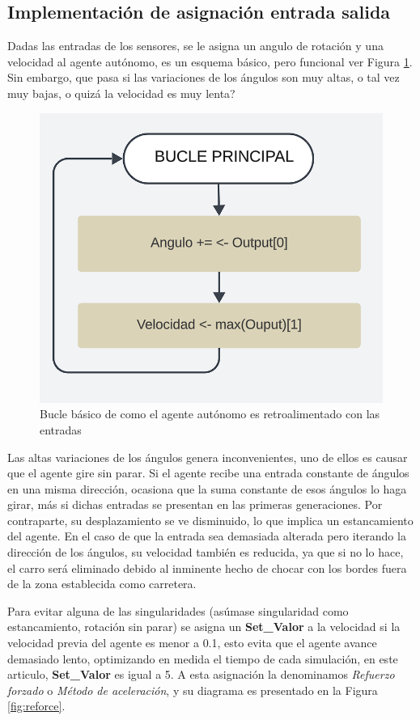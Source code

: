 \documentclass[conference]{IEEEtran}
\begin{document}
\subsection{Implementación de asignación entrada  salida}
Dadas las entradas de los sensores, se le asigna un angulo de rotación y una velocidad al agente autónomo, es un esquema básico, pero funcional ver Figura \ref{fig:Bucle_basico}. Sin embargo, que pasa si las variaciones de los ángulos son muy altas, o tal vez muy bajas, o quizá la velocidad es muy lenta?
\begin{figure}
    \centering
    \includegraphics[scale=0.25]{images/bucle_inicial.png}
    \caption{Bucle básico de como el agente autónomo es retroalimentado con las entradas}
    \label{fig:Bucle_basico}
\end{figure} 
Las altas variaciones de los ángulos genera inconvenientes, uno de ellos es causar que el agente gire sin parar. Si el agente recibe una entrada constante de ángulos en una misma dirección, ocasiona que la suma constante de esos ángulos lo haga girar, más si dichas entradas se presentan en las primeras generaciones. Por contraparte, su desplazamiento se ve disminuido, lo que implica un estancamiento del agente. En el caso de que la entrada sea demasiada alterada pero iterando la dirección de los ángulos, su velocidad también es reducida, ya que si no lo hace, el carro será eliminado debido al inminente hecho de chocar con los bordes fuera de la zona establecida como carretera.

Para evitar alguna de las singularidades (asúmase singularidad como estancamiento, rotación sin parar) se asigna un \textbf{Set\_Valor} a la velocidad si la velocidad previa del agente es menor a 0.1, esto evita que el agente avance demasiado lento, optimizando en medida el tiempo de cada simulación, en este articulo, \textbf{Set\_Valor} es igual a 5. A esta asignación la denominamos \textit{Refuerzo forzado} o \textit{Método de aceleración}, y su diagrama es presentado en la Figura \ref{fig:reforce}.
\end{document}
